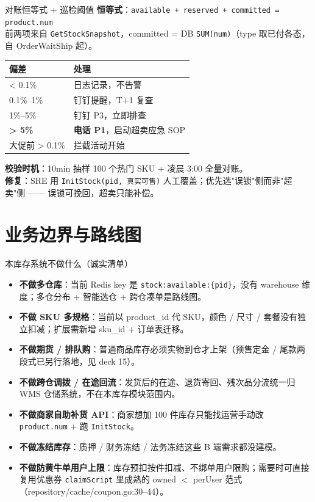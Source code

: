 \documentclass[aspectratio=169,11pt]{beamer}
\begin{document}
\begin{frame}[shrink]{对账恒等式 + 巡检阈值}
\textbf{恒等式}：\texttt{available + reserved + committed = product.num}\\
前两项来自 \texttt{GetStockSnapshot}，committed = DB \texttt{SUM(num)}（type 取已付各态，自 OrderWaitShip 起）。
\vspace{1mm}
\begin{tabular}{@{}lp{6cm}@{}}
\toprule
偏差 & 处理 \\
\midrule
< 0.1\% & 日志记录，不告警 \\
0.1\%--1\% & 钉钉提醒，T+1 复查 \\
1\%--5\%  & 钉钉 P3，立即排查 \\
\textbf{> 5\%} & \textbf{电话 P1}，启动超卖应急 SOP \\
大促前 > 0.1\% & 拦截活动开始 \\
\bottomrule
\end{tabular}
\vspace{2mm}
\small \textbf{校验时机}：10min 抽样 100 个热门 SKU + 凌晨 3:00 全量对账。\\
\textbf{修复}：SRE 用 \texttt{InitStock(pid, 真实可售)} 人工覆盖；优先选"误锁"侧而非"超卖"侧 —— 误锁可挽回，超卖只能补偿。
\end{frame}

\section{业务边界与路线图}

\begin{frame}[shrink]{本库存系统不做什么（诚实清单）}
\begin{itemize}
  \item \textbf{不做多仓库}：当前 Redis key 是 \texttt{stock:available:\{pid\}}，没有 warehouse 维度；多仓分布 + 智能选仓 + 跨仓凑单是路线图。
  \item \textbf{不做 SKU 多规格}：当前以 product\_id 代 SKU，颜色 / 尺寸 / 套餐没有独立扣减；扩展需新增 sku\_id + 订单表迁移。
  \item \textbf{不做期货 / 排队购}：普通商品库存必须实物到仓才上架（预售定金 / 尾款两段式已另行落地，见 deck 15）。
  \item \textbf{不做跨仓调拨 / 在途回流}：发货后的在途、退货寄回、残次品分流统一归 WMS 仓储系统，不在本库存模块范围内。
  \item \textbf{不做商家自助补货 API}：商家想加 100 件库存只能找运营手动改 \texttt{product.num} + 跑 \texttt{InitStock}。
  \item \textbf{不做冻结库存}：质押 / 财务冻结 / 法务冻结这些 B 端需求都没建模。
  \item \textbf{不做防黄牛单用户上限}：库存预扣按件扣减、不绑单用户限购；需要时可直接复用优惠券 \texttt{claimScript} 里成熟的 owned $<$ perUser 范式（repository/cache/coupon.go:30--44）。
\end{itemize}
\end{frame}
\end{document}
